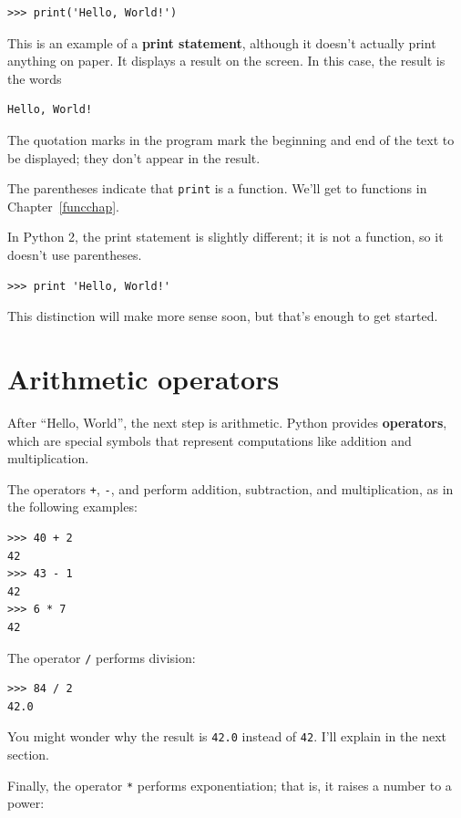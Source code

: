 \documentclass[10pt]{book}
\begin{document}
\begin{verbatim}
>>> print('Hello, World!')
\end{verbatim}
%
This is an example of a {\bf print statement}, although it
doesn't actually print anything on paper.  It displays a result on the
screen.  In this case, the result is the words

\begin{verbatim}
Hello, World!
\end{verbatim}
%
The quotation marks in the program mark the beginning and end
of the text to be displayed; they don't appear in the result.

The parentheses indicate that {\tt print} is a function.  We'll get
to functions in Chapter~\ref{funcchap}.
 

In Python 2, the print statement is slightly different; it is not
a function, so it doesn't use parentheses.

\begin{verbatim}
>>> print 'Hello, World!'
\end{verbatim}
%
This distinction will make more sense soon, but that's enough to
get started.


\section{Arithmetic operators}

After ``Hello, World'', the next step is arithmetic.  Python provides
{\bf operators}, which are special symbols that represent computations
like addition and multiplication.

The operators {\tt +}, {\tt -}, and {\tt *} perform addition,
subtraction, and multiplication, as in the following examples:

\begin{verbatim}
>>> 40 + 2
42
>>> 43 - 1
42
>>> 6 * 7
42
\end{verbatim}
%
The operator {\tt /} performs division:

\begin{verbatim}
>>> 84 / 2
42.0
\end{verbatim}
%
You might wonder why the result is {\tt 42.0} instead of {\tt 42}.
I'll explain in the next section.

Finally, the operator {\tt **} performs exponentiation; that is,
it raises a number to a power:
\end{document}
